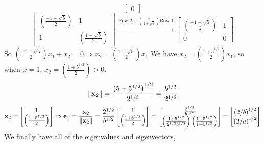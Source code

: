 \begin{enumerate}[font=\bfseries]
\[\begin{bmatrix}
                0
            \end{bmatrix}
        \]
        \[
            \begin{bmatrix}
                \left(\frac{-1 - \sqrt{5}}{2}\right) & 1 \\
                1 & \left(\frac{1 - \sqrt{5}}{2}\right)
            \end{bmatrix}
            \overset{\text{Row 2} + \left(\frac{2}{1 + \sqrt{5}}\right)\text{Row 1}}{\longrightarrow}
            \begin{bmatrix}
                \left(\frac{-1 - \sqrt{5}}{2}\right) & 1 \\
                0 & 0
            \end{bmatrix}
        \]
        So $\left(\frac{-1 - \sqrt{5}}{2}\right)x_1 + x_2 = 0 \Rightarrow x_2 = \left(\frac{1 + \sqrt{5}}{2}\right)x_1$
        \newline
        We have $x_2 = \left(\frac{1 + 5^{1/2}}{2}\right)x_1$, so when $x = 1$, $x_2 = \left(\frac{1 + 5^{1/2}}{2}\right) > 0$.
        \[
            {\left\|\bold{x}_2\right\|} = \frac{{\left(5 + 5^{1/2}\right)}^{1/2}}{2^{1/2}} = \frac{b^{1/2}}{2^{1/2}}
        \]
        \[
            \bold{x}_2
            =
            \begin{bmatrix}
                1 \\
                \left(\frac{1 + 5^{1/2}}{2}\right)
            \end{bmatrix}
            \Rightarrow
            \bold{e}_1
            =
            \frac{\bold{x}_2}{\left\|\bold{x}_2\right\|}
            =
            \frac{2^{1/2}}{b^{1/2}}
            \begin{bmatrix}
                1 \\
                \left(\frac{1 + 5^{1/2}}{2}\right)
            \end{bmatrix}
            =
            \begin{bmatrix}
                \frac{2^{1/2}}{b^{1/2}} \\
                \left(\frac{1 + 5^{1/2}}{2^{1/2}b^{1/2}}\right) \left(\frac{1 - 5^{1/2}}{1 - 5^{1/2}}\right)
            \end{bmatrix}
            =
            \begin{bmatrix}
                {\left(2/b\right)}^{1/2} \\
                {\left(2/a\right)}^{1/2}
            \end{bmatrix}
        \]
        We finally have all of the eigenvalues and eigenvectors,

\end{enumerate}
